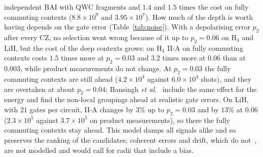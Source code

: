 \documentclass[aps,pra,reprint,superscriptaddress,nofootinbib]{revtex4-2}
\begin{document}
independent BAI with QWC fragments and $1.4$ and $1.5$ times the cost on fully commuting contexts ($8.8\times10^{9}$ and $3.95\times10^{7}$). How much of the depth is worth having depends on the gate error (Table~\ref{tab:noise}). With a depolarising error $p_2$ after every CZ, no selection went wrong because of it up to $p_2=0.06$ on H$_4$ and LiH, but the cost of the deep contexts grows: on H$_4$ II-A on fully commuting contexts costs $1.5$ times more at $p_2=0.03$ and $3.2$ times more at $0.06$ than at $0.003$, while product measurements do not change. At $p_2=0.03$ the fully commuting contexts are still ahead ($4.2\times10^{4}$ against $6.0\times10^{4}$ shots), and they are overtaken at about $p_2=0.04$; Bansingh \textit{et al.}~\cite{bansingh2022} include the same effect for the energy and find the non-local groupings ahead at realistic gate errors. On LiH, with $21$ gates per circuit, II-A changes by $3\%$ up to $p_2=0.03$ and by $13\%$ at $0.06$ ($2.3\times10^{5}$ against $3.7\times10^{5}$ on product measurements), so there the fully commuting contexts stay ahead. This model damps all signals alike and so preserves the ranking of the candidates; coherent errors and drift, which do not~\cite{haravu2026,larrucea2026}, are not modelled and would call for radii that include a bias.
\end{document}
